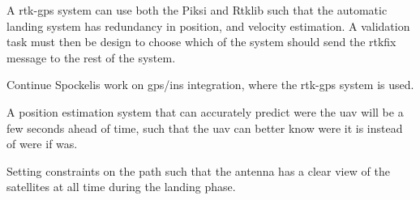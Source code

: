 A \gls{rtk-gps} system can use both the Piksi and Rtklib such that the automatic landing system has redundancy in position, and velocity estimation. A validation task must then be design to choose which of the system should send the rtkfix message to the rest of the system.

Continue Spockelis work on gps/ins integration, where the rtk-gps system is used.

A position estimation system that can accurately predict were the \gls{uav} will be a few seconds ahead of time, such that the \gls{uav} can better know were it is instead of were if was.

Setting constraints on the path such that the antenna has a clear view of the satellites at all time during the landing phase. 
\cleardoublepage